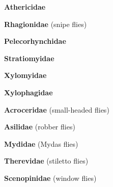\documentclass[letterpaper,10pt]{article}
\begin{document}
{\makebox[0.6cm]{}  \textbf{Athericidae} \par
\makebox[0.6cm]{}  \textbf{Rhagionidae} (snipe flies) \par
\makebox[0.6cm]{}  \textbf{Pelecorhynchidae} \par
\makebox[0.6cm]{}  \textbf{Stratiomyidae} \par
\makebox[0.6cm]{}  \textbf{Xylomyidae}  \par
\makebox[0.6cm]{}  \textbf{Xylophagidae} \par
\makebox[0.6cm]{}  \textbf{Acroceridae} (small-headed flies) \par
\makebox[0.6cm]{}  \textbf{Asilidae} (robber flies) \par
\makebox[0.6cm]{}  \textbf{Mydidae} (Mydas flies) \par
\makebox[0.6cm]{}  \textbf{Therevidae} (stiletto flies) \par
\makebox[0.6cm]{}  \textbf{Scenopinidae} (window flies) \par
}
\end{document}
